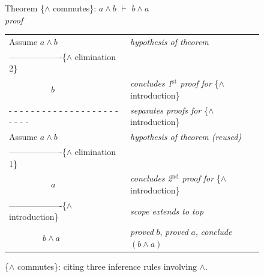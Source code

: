 \begin{figure}
Theorem \{$\wedge$ commutes\}: $a \wedge b$ $\vdash$ $b \wedge a$ \\
\emph{proof}
\begin{center}
\begin{spacing}{0.9}
\begin{tabular}{ll}
Assume $a \wedge b$                             &\emph{hypothesis of theorem}\\
-------------------\{$\wedge$ elimination 2\}   &\\
~~~~~~~~~~$b$                                   &\emph{concludes 1$^{\text{st}}$ proof for} \{$\wedge$ introduction\}\\
 - - - - - - - - - - - - - - - - - - - - - - - -&\emph{separates proofs for} \{$\wedge$ introduction\}\\
Assume $a \wedge b$                             &\emph{hypothesis of theorem (reused)}\\
-------------------\{$\wedge$ elimination 1\}   &\\
~~~~~~~~~~$a$                                   &\emph{concludes 2$^{\text{nd}}$ proof for} \{$\wedge$ introduction\}\\
-------------------\{$\wedge$ introduction\}    &\emph{scope extends to top}\\
~~~~~~~~$b \wedge a$                            &\emph{proved} $b$, \emph{proved} $a$, \emph{conclude} $(b \wedge a)$\\
\end{tabular}
\end{spacing}
\end{center}
\caption{\{$\wedge$ commutes\}: citing three inference rules involving $\wedge$.}
\label{fig:and-commutes-proof}
\end{figure}

